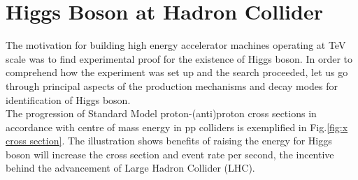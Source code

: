 \section{Higgs Boson at Hadron Collider}
The motivation for building high energy accelerator machines operating at TeV scale was to find experimental proof for the existence of Higgs boson. In order to comprehend how the experiment was set up and the search proceeded, let us go through principal aspects of the production mechanisms and decay modes for identification of Higgs boson.\\ 
The progression of Standard Model proton-(anti)proton cross sections in accordance with centre of mass energy in pp colliders is exemplified in Fig.\ref{fig:x cross section}. The illustration shows benefits of raising the energy for Higgs boson will increase the cross section and event rate per second, the incentive behind the advancement of Large Hadron Collider (LHC).

